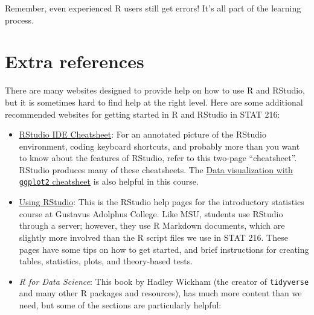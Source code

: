 \documentclass[
  10pt,
  openany]{book}
\theoremstyle{definition}
\theoremstyle{definition}
\theoremstyle{definition}
\theoremstyle{definition}
\theoremstyle{remark}
\begin{document}
Remember, even experienced R users still get errors! It's all part of the learning process.

\section*{Extra references}\label{extra-references}

There are many websites designed to provide help on how to use R and RStudio, but it is sometimes hard to find help at the right level. Here are some additional recommended websites for getting started in R and RStudio in STAT 216:

\begin{itemize}
\item
  \href{https://github.com/rstudio/cheatsheets/raw/master/rstudio-ide.pdf}{RStudio IDE Cheatsheet}: For an annotated picture of the RStudio environment, coding keyboard shortcuts, and probably more than you want to know about the features of RStudio, refer to this two-page ``cheatsheet''. RStudio produces many of these cheatsheets. The \href{https://github.com/rstudio/cheatsheets/raw/master/data-visualization-2.1.pdf}{Data visualization with \texttt{ggplot2} cheatsheet} is also helpful in this course.
\item
  \href{http://homepages.gac.edu/~anienow2/MCS_142/R/index.html}{Using RStudio}: This is the RStudio help pages for the introductory statistics course at Gustavus Adolphus College. Like MSU, students use RStudio through a server; however, they use R Markdown documents, which are slightly more involved than the R script files we use in STAT 216. These pages have some tips on how to get started, and brief instructions for creating tables, statistics, plots, and theory-based tests.
\item
  \emph{R for Data Science}: This book by Hadley Wickham (the creator of \texttt{tidyverse} and many other R packages and resources), has much more content than we need, but some of the sections are particularly helpful:


\end{itemize}
\end{document}
